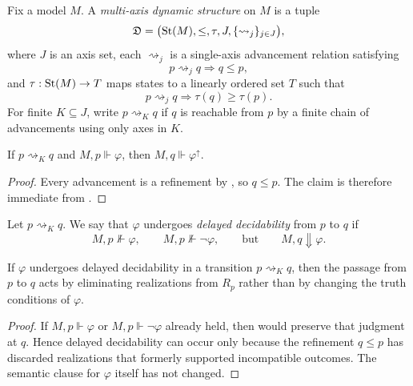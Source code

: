 \begin{definition}\label{def:multi-axis-dynamic-structure}
Fix a model $M$. A \emph{multi-axis dynamic structure} on $M$ is a tuple
\[
\mathfrak{D}=\bigl(\mathrm{St}(M),\le,\tau,J,\{\rightsquigarrow_j\}_{j\in J}\bigr),
\]
where $J$ is an axis set, each $\rightsquigarrow_j$ is a single-axis advancement relation satisfying
\[
p\rightsquigarrow_j q \Longrightarrow q\le p,
\]
and $\tau:\mathrm{St}(M)\to T$ maps states to a linearly ordered set $T$ such that
\[
p\rightsquigarrow_j q \Longrightarrow \tau(q)\ge \tau(p).
\]
For finite $K\subseteq J$, write $p\rightsquigarrow_K q$ if $q$ is reachable from $p$ by a finite chain of advancements using only axes in $K$.
\end{definition}

\begin{proposition}\label{prop:updates-preserve-forcing}
If $p\rightsquigarrow_K q$ and $M,p\Vdash\varphi$, then $M,q\Vdash\varphi^\uparrow$.
\end{proposition}

\begin{proof}
Every advancement is a refinement by , so $q\le p$. The claim is therefore immediate from .
\end{proof}

\begin{definition}\label{def:delayed-decidability}
Let $p\rightsquigarrow_K q$. We say that $\varphi$ undergoes \emph{delayed decidability} from $p$ to $q$ if
\[
M,p\nVdash\varphi,\qquad
M,p\nVdash\neg\varphi,\qquad
\text{but}\qquad
M,q\Downarrow\varphi.
\]
\end{definition}

\begin{proposition}\label{prop:delayed-no-new-truth}
If $\varphi$ undergoes delayed decidability in a transition $p\rightsquigarrow_K q$, then the passage from $p$ to $q$ acts by eliminating realizations from $R_p$ rather than by changing the truth conditions of $\varphi$.
\end{proposition}

\begin{proof}
If $M,p\Vdash\varphi$ or $M,p\Vdash\neg\varphi$ already held, then  would preserve that judgment at $q$. Hence delayed decidability can occur only because the refinement $q\le p$ has discarded realizations that formerly supported incompatible outcomes. The semantic clause for $\varphi$ itself has not changed.
\end{proof}

